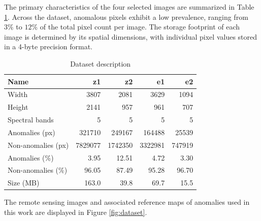 \documentclass[lettersize,journal]{IEEEtran}
\begin{document}
The primary characteristics of the four selected images are summarized in Table \ref{tab:data-description}. Across the dataset, anomalous pixels exhibit a low prevalence, ranging from $3\%$ to $12\%$ of the total pixel count per image. The storage footprint of each image is determined by its spatial dimensions, with individual pixel values stored in a 4-byte precision format.

\begin{table}[t]
\footnotesize
    \centering
        \caption{Dataset description}
    \begin{tabular}{l r r r r }
        \toprule
        \textbf{Name}	&	 {\textbf{z1}}	&	 {\textbf{z2}}	&	 {\textbf{e1}}	&	 {\textbf{e2}}  \\
        \midrule
        Width	&	 3807	&	 2081	&	 3629	&	 1094 \\
        Height	&	 2141	&	 957	&	 961	&	 707\\
        Spectral bands	&	 5	&	 5	&	 5	&	 5\\
        Anomalies (px) 	&	 321710	&	  249167	&	 164488	&	 25539\\
        Non-anomalies (px)	&	 7829077	&	 1742350	&	 3322981	&	 747919\\
        Anomalies (\%) 	&	 3.95 	&	 12.51	&	 4.72	&	 3.30\\
        Non-anomalies (\%) 	&	 96.05 	&	 87.49	&	 95.28	&	 96.70\\
        Size (MB)	&	 163.0	&	 39.8	&	 69.7	&	 15.5\\ 
        \bottomrule
    \end{tabular}
    \label{tab:data-description}
\end{table}

The remote sensing images and associated reference maps of anomalies used in this work are displayed in Figure \ref{fig:dataset}. 



\end{document}
